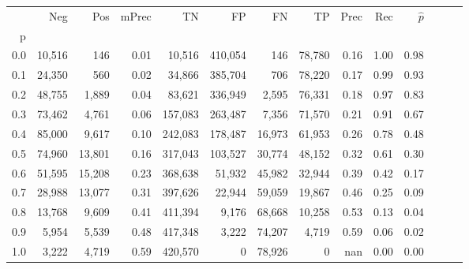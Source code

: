 \begin{tabular}{rrrrrrrrrrrrrr}
\toprule
{} &     Neg &     Pos & mPrec &       TN &       FP &      FN &      TP &  Prec &   Rec & $\hat{p}$ \\
p   &         &         &       &          &          &         &         &       &       &           \\
\midrule
0.0 &  10,516 &     146 &  0.01 &   10,516 &  410,054 &     146 &  78,780 &  0.16 &  1.00 &      0.98 \\
0.1 &  24,350 &     560 &  0.02 &   34,866 &  385,704 &     706 &  78,220 &  0.17 &  0.99 &      0.93 \\
0.2 &  48,755 &   1,889 &  0.04 &   83,621 &  336,949 &   2,595 &  76,331 &  0.18 &  0.97 &      0.83 \\
0.3 &  73,462 &   4,761 &  0.06 &  157,083 &  263,487 &   7,356 &  71,570 &  0.21 &  0.91 &      0.67 \\
0.4 &  85,000 &   9,617 &  0.10 &  242,083 &  178,487 &  16,973 &  61,953 &  0.26 &  0.78 &      0.48 \\
0.5 &  74,960 &  13,801 &  0.16 &  317,043 &  103,527 &  30,774 &  48,152 &  0.32 &  0.61 &      0.30 \\
0.6 &  51,595 &  15,208 &  0.23 &  368,638 &   51,932 &  45,982 &  32,944 &  0.39 &  0.42 &      0.17 \\
0.7 &  28,988 &  13,077 &  0.31 &  397,626 &   22,944 &  59,059 &  19,867 &  0.46 &  0.25 &      0.09 \\
0.8 &  13,768 &   9,609 &  0.41 &  411,394 &    9,176 &  68,668 &  10,258 &  0.53 &  0.13 &      0.04 \\
0.9 &   5,954 &   5,539 &  0.48 &  417,348 &    3,222 &  74,207 &   4,719 &  0.59 &  0.06 &      0.02 \\
1.0 &   3,222 &   4,719 &  0.59 &  420,570 &        0 &  78,926 &       0 &   nan &  0.00 &      0.00 \\
\bottomrule
\end{tabular}
